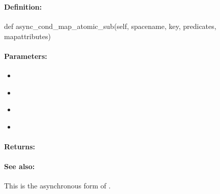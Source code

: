 \pagebreak
\subsubsection{}
\label{api:python:async_cond_map_atomic_sub}


\paragraph{Definition:}
\begin{pythoncode}
def async_cond_map_atomic_sub(self, spacename, key, predicates, mapattributes)
\end{pythoncode}

\paragraph{Parameters:}
\begin{itemize}[noitemsep]
\item {}\\

\item {}\\

\item {}\\

\item {}\\

\end{itemize}

\paragraph{Returns:}


\paragraph{See also:}  This is the asynchronous form of .

\pagebreak
\subsubsection{}
\label{api:python:group_map_atomic_sub}


